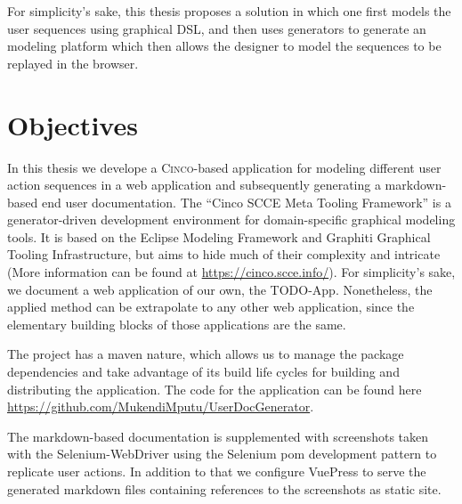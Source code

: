 For simplicity's sake, this thesis proposes a solution in which one first models the user sequences using graphical DSL, and then uses generators to generate an modeling platform which then allows the designer to model the sequences to be replayed in the browser.

\section{Objectives}
In this thesis we develope a \textsc{Cinco}-based application for modeling different user action sequences in a web application and subsequently generating a markdown-based end user documentation. The “Cinco SCCE Meta Tooling Framework” is a generator-driven development environment for domain-specific graphical modeling tools. It is based on the Eclipse Modeling Framework and Graphiti Graphical Tooling Infrastructure, but aims to hide much of their complexity and intricate  (More information can be found at \url{https://cinco.scce.info/})\cite{Cinco}. For simplicity's sake, we document a web application of our own, the TODO-App. Nonetheless, the applied method can be extrapolate to any other web application, since the elementary building blocks of those applications are the same.

The project has a maven nature, which allows us to manage the package dependencies and take advantage of its build life cycles for building and distributing the application. The code for the application can be found here \url{https://github.com/MukendiMputu/UserDocGenerator}.

The markdown-based documentation is supplemented with screenshots taken with the Selenium-WebDriver using the \gls{Selenium} \acrfull{pom} development pattern to replicate user actions. In addition to that we configure \gls{VuePress} to serve the generated markdown files containing references to the screenshots as static site.

